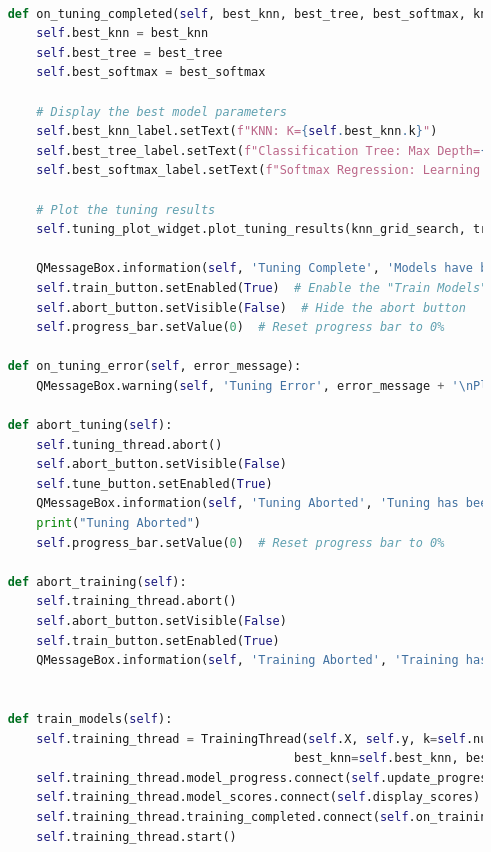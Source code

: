\documentclass[letterpaper,10pt]{article}
\begin{document}
\begin{lstlisting}[language=Python, caption=ui.py - Final structure after refactoring. ]
    
    def on_tuning_completed(self, best_knn, best_tree, best_softmax, knn_grid_search, tree_grid_search, softmax_grid_search):
        self.best_knn = best_knn
        self.best_tree = best_tree
        self.best_softmax = best_softmax

        # Display the best model parameters
        self.best_knn_label.setText(f"KNN: K={self.best_knn.k}")
        self.best_tree_label.setText(f"Classification Tree: Max Depth={self.best_tree.max_depth}, Min Size={self.best_tree.min_size}")
        self.best_softmax_label.setText(f"Softmax Regression: Learning Rate={self.best_softmax.learning_rate}, N Iterations={self.best_softmax.n_iterations}")

        # Plot the tuning results
        self.tuning_plot_widget.plot_tuning_results(knn_grid_search, tree_grid_search, softmax_grid_search)

        QMessageBox.information(self, 'Tuning Complete', 'Models have been tuned successfully.')
        self.train_button.setEnabled(True)  # Enable the "Train Models" button
        self.abort_button.setVisible(False)  # Hide the abort button
        self.progress_bar.setValue(0)  # Reset progress bar to 0%
    
    def on_tuning_error(self, error_message):
        QMessageBox.warning(self, 'Tuning Error', error_message + '\nPlease check if the columns were inputted correctly during the preprocessing phase.')
    
    def abort_tuning(self):
        self.tuning_thread.abort()
        self.abort_button.setVisible(False)
        self.tune_button.setEnabled(True)
        QMessageBox.information(self, 'Tuning Aborted', 'Tuning has been aborted.')
        print("Tuning Aborted")
        self.progress_bar.setValue(0)  # Reset progress bar to 0%
    
    def abort_training(self):
        self.training_thread.abort()
        self.abort_button.setVisible(False)
        self.train_button.setEnabled(True)
        QMessageBox.information(self, 'Training Aborted', 'Training has been aborted.')

    
    def train_models(self):
        self.training_thread = TrainingThread(self.X, self.y, k=self.num_folds, seed=self.training_seed, preprocessor=self.preprocessor,
                                            best_knn=self.best_knn, best_tree=self.best_tree, best_softmax=self.best_softmax)
        self.training_thread.model_progress.connect(self.update_progress)
        self.training_thread.model_scores.connect(self.display_scores)
        self.training_thread.training_completed.connect(self.on_training_completed)
        self.training_thread.start()
        

\end{lstlisting}
\end{document}
